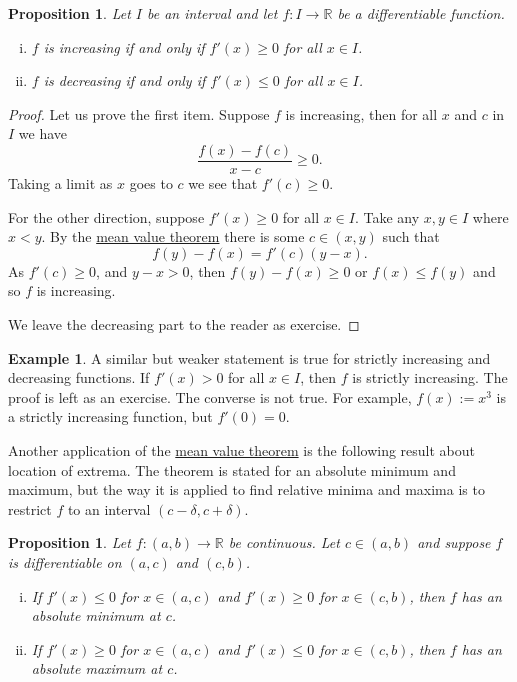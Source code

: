 \documentclass[12pt]{book}
\newcommand{\R}{{\mathbb{R}}}
\theoremstyle{plain}
\newtheorem{prop}[thm]{Proposition}
\theoremstyle{remark}
\theoremstyle{definition}
\theoremstyle{exercise}
\theoremstyle{example}
\newtheorem{example}[thm]{Example}
\begin{document}
\begin{prop} \label{incdecdiffprop}
Let $I$ be an interval and
let $f \colon I \to \R$ be a differentiable function.
\begin{enumerate}[(i)]
\item $f$ is increasing if and only if $f'(x) \geq 0$ for all $x \in I$.
\item $f$ is decreasing if and only if $f'(x) \leq 0$ for all $x \in I$.
\end{enumerate}
\end{prop}

\begin{proof}
Let us prove the first item.  Suppose $f$ is increasing, then
for all $x$ and $c$ in $I$ we have
\begin{equation*}
\frac{f(x)-f(c)}{x-c} \geq 0 .
\end{equation*}
Taking a limit as $x$ goes to $c$ we see that $f'(c) \geq 0$.

For the other direction, suppose $f'(x) \geq 0$ for all $x \in I$.
Take any $x, y \in I$ where $x < y$.  By the \hyperref[thm:mvt]{mean value theorem}
there is some $c \in
(x,y)$ such that
\begin{equation*}
f(y)-f(x) = f'(c)(y-x) .
\end{equation*}
As $f'(c) \geq 0$, and $y-x > 0$, then $f(y) - f(x) \geq 0$ or $f(x) \leq
f(y)$ and so
$f$ is increasing.

We leave the decreasing part to the reader as exercise.
\end{proof}

\begin{example}
A similar but weaker statement is true for strictly increasing and
decreasing functions.  If $f'(x) > 0$ for all $x \in I$, then
$f$ is strictly increasing.  The proof is left as an exercise.
The converse is not true.  For example,
$f(x) := x^3$ is a strictly increasing function, but $f'(0) = 0$.
\end{example}

Another application of the \hyperref[thm:mvt]{mean value theorem} is the following result about
location of extrema.  The theorem is stated for an absolute minimum and
maximum, but the way it is applied to find relative minima
and maxima is to restrict $f$ to an interval $(c-\delta,c+\delta)$.

\begin{prop} \label{firstderminmaxtest}
Let $f \colon (a,b) \to \R$ be continuous.  Let $c \in (a,b)$
and suppose
$f$ is differentiable on $(a,c)$ and $(c,b)$.
\begin{enumerate}[(i)]
\item If $f'(x) \leq 0$ for $x \in (a,c)$ and
 $f'(x) \geq 0$ for $x \in (c,b)$, then $f$ has an absolute minimum 
at $c$.
\item If $f'(x) \geq 0$ for $x \in (a,c)$ and
 $f'(x) \leq 0$ for $x \in (c,b)$, then $f$ has an absolute maximum
at $c$.
\end{enumerate}
\end{prop}
\end{document}
